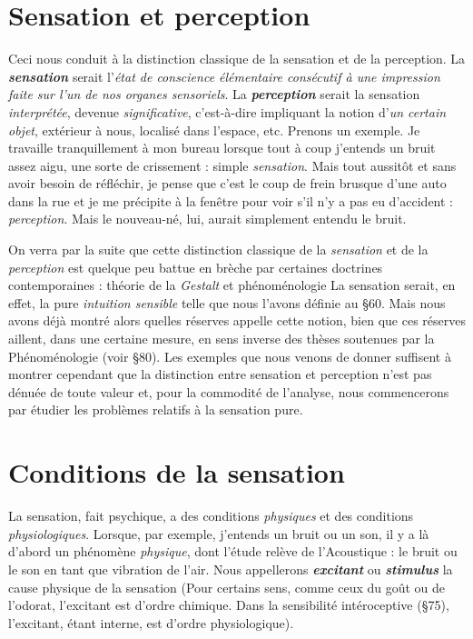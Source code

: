 \section{Sensation et perception}%
Ceci nous conduit à la distinction
classique de la sensation et de la perception. La \textbf{\textit {sensation}}
serait l’{\it état de conscience élémentaire consécutif à une impression faite
sur l’un de nos organes sensoriels}. La \textbf{\textit {perception}} serait la sensation
{\it interprétée}, devenue {\it significative}, c’est-à-dire impliquant la notion
d’{\it un certain objet}, extérieur à nous, localisé dans l’espace, etc. Prenons
un exemple. Je travaille tranquillement à mon bureau lorsque tout
à coup j'entends un bruit assez aigu, une sorte de crissement : simple
{\it sensation}. Mais tout aussitôt et sans avoir besoin de réfléchir, je
pense que c’est le coup de frein brusque d’une auto dans la rue et
je me précipite à la fenêtre pour voir s’il n’y a pas eu d’accident :
{\it perception}. Mais le nouveau-né, lui, aurait simplement entendu le
bruit.

On verra par la suite que cette distinction classique de la {\it sensation}
et de la {\it perception} est quelque peu battue en brèche par certaines
doctrines contemporaines : théorie de la {\it Gestalt} et phénoménologie
La sensation serait, en effet, la pure {\it intuition sensible} telle que nous
l'avons définie au \S 60. Mais nous avons déjà montré alors quelles
réserves appelle cette notion, bien que ces réserves aillent, dans une
certaine mesure, en sens inverse des thèses soutenues par la Phénoménologie
(voir \S 80). Les exemples que nous venons de donner
suffisent à montrer cependant que la distinction entre sensation et
perception n’est pas dénuée de toute valeur et, pour la commodité
de l'analyse, nous commencerons par étudier les problèmes relatifs
à la sensation pure.

\section{Conditions de la sensation}%
La sensation, fait psychique,
a des conditions {\it physiques} et des conditions {\it physiologiques}. Lorsque,
par exemple, j'entends un bruit ou un son, il y a là d’abord un phénomène
{\it physique}, dont l'étude relève de l’Acoustique : le bruit ou le
son en tant que vibration de l’air. Nous appellerons \textbf{\textit {excitant}} ou
\textbf{\textit {stimulus}} la cause {\it }physique de la sensation
{\scriptsize (Pour certains sens, comme ceux du goût ou de l’odorat, l’excitant est d'ordre
chimique. Dans la sensibilité intéroceptive (\S 75), l’excitant, étant interne, est d'ordre
physiologique)}.

